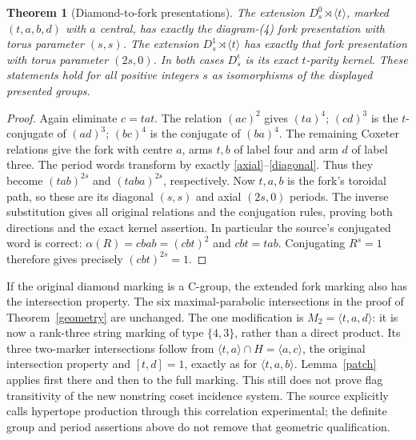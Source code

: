 \documentclass[11pt,a4paper]{article}
\newtheorem{theorem}{Theorem}
\newcommand{\gp}[1]{\langle #1\rangle}
\begin{document}
\begin{theorem}[Diamond-to-fork presentations]\label{diamondfold}
The extension $D_s^0\rtimes\gp t$, marked $(t,a,b,d)$ with $a$ central,
has exactly the diagram-(4) fork presentation with torus parameter $(s,s)$.
The extension $D_s^1\rtimes\gp t$ has exactly that fork presentation with
torus parameter $(2s,0)$. In both cases $D_s^\epsilon$ is its exact
$t$-parity kernel. These statements hold for all positive integers $s$
as isomorphisms of the displayed presented groups.
\end{theorem}
\begin{proof}
Again eliminate $c=tat$. The relation $(ac)^2$ gives $(ta)^4$; $(cd)^3$
is the $t$-conjugate of $(ad)^3$; $(bc)^4$ is the conjugate of $(ba)^4$.
The remaining Coxeter relations give the fork with centre $a$, arms
$t,b$ of label four and arm $d$ of label three. The period words transform
by exactly \eqref{axial}--\eqref{diagonal}. Thus they become $(tab)^{2s}$
and $(taba)^{2s}$, respectively. Now $t,a,b$ is the fork's toroidal path,
so these are its diagonal $(s,s)$ and axial $(2s,0)$ periods. The inverse
substitution gives all original relations and the conjugation rules,
proving both directions and the exact kernel assertion. In particular the
source's conjugated word is correct: $\alpha(R)=cbab=(cbt)^2$ and
$cbt=tab$. Conjugating $R^s=1$ therefore gives precisely
$(cbt)^{2s}=1$.
\end{proof}

If the original diamond marking is a C-group, the extended fork marking
also has the intersection property. The six maximal-parabolic
intersections in the proof of Theorem~\ref{geometry} are unchanged.
The one modification is $M_2=\gp{t,a,d}$: it is now a rank-three string
marking of type $\{4,3\}$, rather than a direct product. Its three
two-marker intersections follow from
$\gp{t,a}\cap H=\gp{a,c}$, the original intersection property and
$[t,d]=1$, exactly as for $\gp{t,a,b}$. Lemma~\ref{patch} applies first
there and then to the full marking. This still does not prove flag
transitivity of the new nonstring coset incidence system. The source
explicitly calls hypertope production through this correlation experimental;
the definite group and period assertions above do not remove that
geometric qualification.
\end{document}
